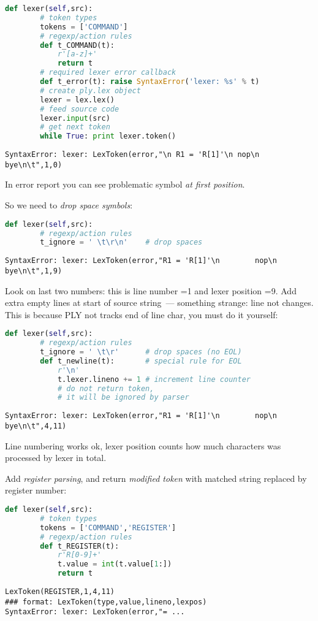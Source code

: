 \begin{lstlisting}[language=python]
	def lexer(self,src):
		# token types
		tokens = ['COMMAND']		
		# regexp/action rules
		def t_COMMAND(t):
			r'[a-z]+'
			return t
		# required lexer error callback
		def t_error(t): raise SyntaxError('lexer: %s' % t)
		# create ply.lex object
		lexer = lex.lex()				
		# feed source code
		lexer.input(src)				
		# get next token						 
		while True: print lexer.token()	
\end{lstlisting}
\begin{lstlisting}
SyntaxError: lexer: LexToken(error,"\n R1 = 'R[1]'\n nop\n bye\n\t",1,0)
\end{lstlisting}

In error report you can see problematic symbol \emph{at first position}.

So we need to \emph{drop space symbols}:
\begin{lstlisting}[language=python]
	def lexer(self,src):
		# regexp/action rules
		t_ignore = ' \t\r\n'	# drop spaces
\end{lstlisting}
\begin{lstlisting}
SyntaxError: lexer: LexToken(error,"R1 = 'R[1]'\n        nop\n        bye\n\t",1,9)
\end{lstlisting}
Look on last two numbers: this is line number =1 and lexer position =9. Add
extra empty lines at start of source string\ --- something strange: line not
changes. This is because PLY not tracks end of line char, you must do it
yourself:
\begin{lstlisting}[language=python]
	def lexer(self,src):
		# regexp/action rules
		t_ignore = ' \t\r'		# drop spaces (no EOL)
		def t_newline(t):		# special rule for EOL
			r'\n'
			t.lexer.lineno += 1	# increment line counter
			# do not return token,
			# it will be ignored by parser
\end{lstlisting}
\begin{lstlisting}
SyntaxError: lexer: LexToken(error,"R1 = 'R[1]'\n        nop\n       
bye\n\t",4,11)
\end{lstlisting}
Line numbering works ok, lexer position counts how much characters was processed
by lexer in total.

Add \emph{register parsing}, and return \textit{modified token} with matched
string replaced by register number:
\begin{lstlisting}[language=python]
	def lexer(self,src):
		# token types
		tokens = ['COMMAND','REGISTER']
		# regexp/action rules
		def t_REGISTER(t):
			r'R[0-9]+'
			t.value = int(t.value[1:])
			return t
\end{lstlisting}
\begin{lstlisting}
LexToken(REGISTER,1,4,11)
### format: LexToken(type,value,lineno,lexpos)
SyntaxError: lexer: LexToken(error,"= ...
\end{lstlisting}

